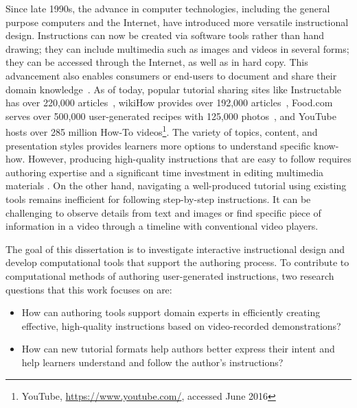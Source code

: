 Since late 1990s, the advance in computer technologies, including the general purpose computers and the Internet, have introduced more versatile instructional design. Instructions can now be created via software tools rather than hand drawing; they can include multimedia such as images and videos in several forms; they can be accessed through the Internet, as well as in hard copy.
%
This advancement also enables consumers or end-users to document and share their domain knowledge~\cite{Lafreniere:2012tl}. As of today, popular tutorial sharing sites like Instructable has over 220,000 articles~\cite{InstructablesProjects}, wikiHow provides over 192,000 articles~\cite{wikiHowStatistics}, Food.com serves over 500,000 user-generated recipes with 125,000 photos~\cite{FoodComAbout}, and YouTube hosts over 285 million How-To videos\footnote{YouTube, \url{https://www.youtube.com/}, accessed June 2016}.
%
The variety of topics, content, and presentation styles provides learners more options to understand specific know-how.
%
However, producing high-quality instructions that are easy to follow requires authoring expertise and a significant time investment in editing multimedia materials \cite{Muller:2009tw}.
%
On the other hand, navigating a well-produced tutorial using existing tools remains inefficient for following step-by-step instructions. It can be challenging to observe details from text and images or find specific piece of information in a video through a timeline with conventional video players.

The goal of this dissertation is to investigate interactive instructional design and develop computational tools that support the authoring process.
%
To contribute to computational methods of authoring user-generated instructions, two research questions that this work focuses on are:\\
\vspace{12pt}
\begin{itemize}
  \item How can authoring tools support domain experts in efficiently creating effective, high-quality instructions based on video-recorded demonstrations?

  \item How can new tutorial formats help authors better express their intent and help learners understand and follow the author's instructions?
\end{itemize}

